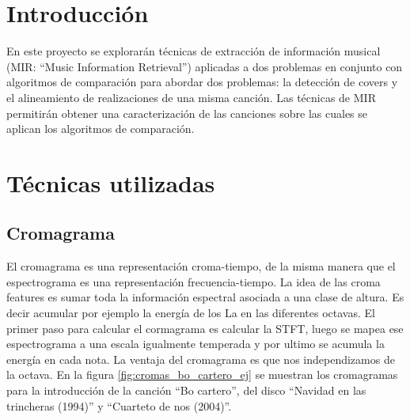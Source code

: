 \documentclass{article}
\begin{document}


\tableofcontents

\newpage

\section{Introducción}

En este proyecto se explorarán técnicas de extracción de información musical (MIR: ``Music Information Retrieval'') aplicadas a dos problemas en conjunto con algoritmos de comparación para abordar dos problemas: la detección de covers y el alineamiento de realizaciones de una misma canción. Las técnicas de MIR permitirán obtener una caracterización de las canciones sobre las cuales se aplican los algoritmos de comparación.

\section{Técnicas utilizadas}

\subsection{Cromagrama}
El cromagrama es una representación croma-tiempo, de la misma manera que el espectrograma es una representación frecuencia-tiempo. La idea de las croma features es sumar toda la información espectral asociada a una clase de altura. Es decir acumular por ejemplo la energía de los La en las diferentes octavas. El primer paso para calcular el cormagrama es calcular la STFT, luego se mapea ese espectrograma a una escala igualmente temperada y por ultimo se acumula la energía en cada nota. La ventaja del cromagrama es que nos independizamos de la octava. En la figura
\ref{fig:cromas_bo_cartero_ej} se muestran los cromagramas para la introducción de la canción ``Bo cartero'', del disco ``Navidad en las trincheras (1994)'' y ``Cuarteto de nos (2004)''. 
 
\end{document}

